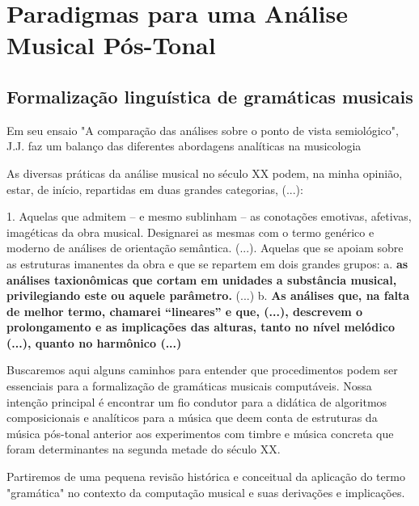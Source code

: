 \documentclass[
	12pt,				%
	openright,			%
	twoside,			%
	a4paper,			%
	english,			%
	french,				%
	spanish,			%
	brazil				%
	]{abntex2}
\begin{document}
\part{Paradigmas para uma Análise Musical Pós-Tonal}
\label{analises}




\chapter{Formalização linguística de gramáticas musicais }

Em seu ensaio "A comparação das análises sobre o ponto de vista semiológico", J.J.  faz um balanço das diferentes abordagens analíticas na musicologia 

\begin{citacao}
As diversas práticas da análise musical no século XX podem, na minha opinião, estar, de início, repartidas em duas grandes categorias, (...): 

1. Aquelas que admitem – e mesmo sublinham – as conotações emotivas, afetivas, imagéticas da obra musical. Designarei as mesmas com o termo genérico e moderno de análises de orientação semântica. (...). Aquelas que se apoiam sobre as estruturas imanentes da obra e que se repartem em dois grandes grupos: a. \textbf{as análises taxionômicas que cortam em unidades a substância musical, privilegiando este ou aquele parâmetro. }(...) b. \textbf{As análises que, na falta de melhor termo, chamarei “lineares” e que, (...), 
descrevem o prolongamento e as implicações das alturas, tanto no nível melódico (...), quanto no harmônico (...)}
\cite[grifos nossos]{nattiezcomparaccao}
\end{citacao}


Buscaremos aqui alguns caminhos para entender que procedimentos podem ser essenciais para a formalização de gramáticas musicais computáveis. Nossa intenção principal é encontrar um fio condutor para a didática de algoritmos composicionais e analíticos para a música que deem conta de estruturas da música pós-tonal anterior aos experimentos com timbre e música concreta que foram determinantes na segunda metade do século XX.  

Partiremos de uma pequena revisão histórica e conceitual da aplicação do termo "gramática" no contexto da computação musical e suas derivações e implicações.  
\end{document}
